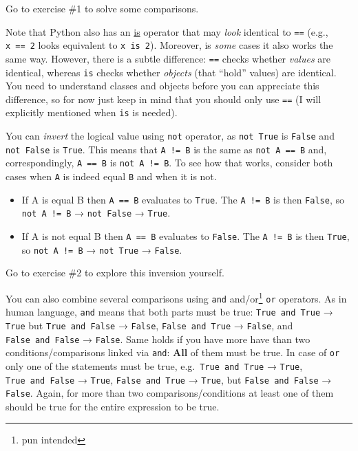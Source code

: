 \documentclass[
]{book}
\providecommand{\tightlist}{%
  \setlength{\itemsep}{0pt}\setlength{\parskip}{0pt}}
\begin{document}
Go to exercise \#1 to solve some comparisons.

Note that Python also has an \href{https://docs.python.org/3/library/operator.html\#operator.is_}{is} operator that may \emph{look} identical to \texttt{==} (e.g., \texttt{x\ ==\ 2} looks equivalent to \texttt{x\ is\ 2}). Moreover, is \emph{some} cases it also works the same way. However, there is a subtle difference: \texttt{==} checks whether \emph{values} are identical, whereas \texttt{is} checks whether \emph{objects} (that ``hold'' values) are identical. You need to understand classes and objects before you can appreciate this difference, so for now just keep in mind that you should only use \texttt{==} (I will explicitly mentioned when \texttt{is} is needed).

You can \emph{invert} the logical value using \texttt{not} operator, as \texttt{not\ True} is \texttt{False} and \texttt{not\ False} is \texttt{True}. This means that \texttt{A\ !=\ B} is the same as \texttt{not\ A\ ==\ B} and, correspondingly, \texttt{A\ ==\ B} is \texttt{not\ A\ !=\ B}. To see how that works, consider both cases when \texttt{A} is indeed equal \texttt{B} and when it is not.

\begin{itemize}
\tightlist
\item
  If A is equal B then \texttt{A\ ==\ B} evaluates to \texttt{True}. The \texttt{A\ !=\ B} is then \texttt{False}, so \texttt{not\ A\ !=\ B} → \texttt{not\ False} → \texttt{True}.
\item
  If A is not equal B then \texttt{A\ ==\ B} evaluates to \texttt{False}. The \texttt{A\ !=\ B} is then \texttt{True}, so \texttt{not\ A\ !=\ B} → \texttt{not\ True} → \texttt{False}.
\end{itemize}

Go to exercise \#2 to explore this inversion yourself.

You can also combine several comparisons using \texttt{and} and/or\footnote{pun intended} \texttt{or} operators. As in human language, \texttt{and} means that both parts must be true: \texttt{True\ and\ True} → \texttt{True} but \texttt{True\ and\ False} → \texttt{False}, \texttt{False\ and\ True} → \texttt{False}, and \texttt{False\ and\ False} → \texttt{False}. Same holds if you have more have than two conditions/comparisons linked via \texttt{and}: \textbf{All} of them must be true. In case of \texttt{or} only one of the statements must be true, e.g.~\texttt{True\ and\ True} → \texttt{True}, \texttt{True\ and\ False} → \texttt{True}, \texttt{False\ and\ True} → \texttt{True}, but \texttt{False\ and\ False} → \texttt{False}. Again, for more than two comparisons/conditions at least one of them should be true for the entire expression to be true.
\end{document}
